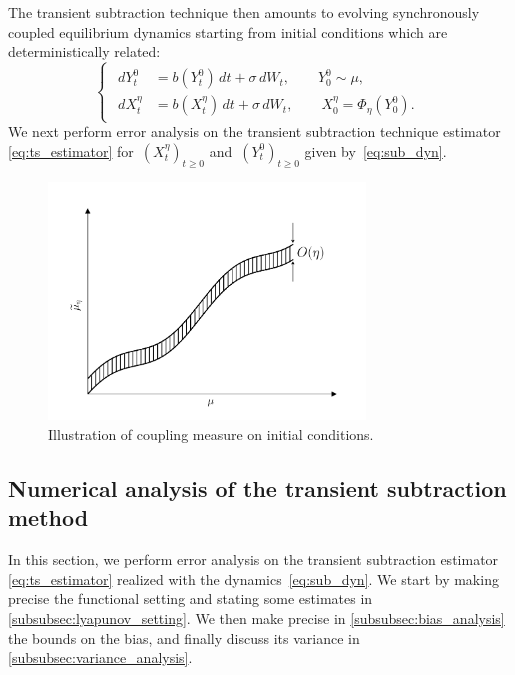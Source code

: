 \documentclass[11pt]{article}
\renewcommand{\geq}{\geqslant}
\theoremstyle{definition}
\begin{document}
The transient subtraction technique then amounts to evolving synchronously coupled equilibrium dynamics starting from initial conditions which are deterministically related:
\begin{equation}
\begin{cases}
\begin{aligned}
	dY_t^0 &= b(Y_t^0) \, dt + \sigma \, dW_t, \qquad Y_0^0 \sim \mu, \\
	dX_t^\eta &= b(X_t^\eta) \, dt + \sigma \, dW_t, \qquad X_0^\eta = \Phi_\eta(Y_0^0).
\end{aligned}
\end{cases}
\label{eq:sub_dyn}
\end{equation}
We next perform error analysis on the transient subtraction technique estimator \eqref{eq:ts_estimator} for~$(X_t^\eta)_{t\geq 0}$ and~$(Y_t^0)_{t\geq 0}$ given by~\eqref{eq:sub_dyn}.
 
\begin{figure}
    \centering
	\includegraphics[width=0.75\textwidth]{coup_meas_plot.pdf}
	\caption{Illustration of coupling measure on initial conditions.}
	\label{fig:coup_meas_mock}
\end{figure}

\subsection{Numerical analysis of the transient subtraction method}
\label{subsec:num_anal_ts}
In this section, we perform error analysis on the transient subtraction estimator \eqref{eq:ts_estimator} realized with the dynamics~\eqref{eq:sub_dyn}. We start by making precise the functional setting and stating some estimates in \cref{subsubsec:lyapunov_setting}. We then make precise in \cref{subsubsec:bias_analysis} the bounds on the bias, and finally discuss its variance in \cref{subsubsec:variance_analysis}.
\end{document}
